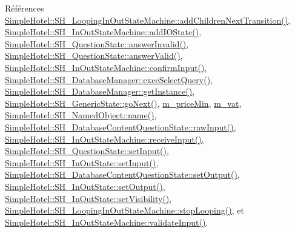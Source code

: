 Références \hyperlink{classSimpleHotel_1_1SH__LoopingInOutStateMachine_a2ac2ff43d97fd1b12e1b30d6818f33e4}{Simple\-Hotel\-::\-S\-H\-\_\-\-Looping\-In\-Out\-State\-Machine\-::add\-Children\-Next\-Transition()}, \hyperlink{classSimpleHotel_1_1SH__InOutStateMachine_a07ae9f1f74a9a41b26e77a014679a33e}{Simple\-Hotel\-::\-S\-H\-\_\-\-In\-Out\-State\-Machine\-::add\-I\-O\-State()}, \hyperlink{classSimpleHotel_1_1SH__QuestionState_a69caaa66c68de820a5afa9584f24ca31}{Simple\-Hotel\-::\-S\-H\-\_\-\-Question\-State\-::answer\-Invalid()}, \hyperlink{classSimpleHotel_1_1SH__QuestionState_ad69b23cffd57936805e7b66483c5c951}{Simple\-Hotel\-::\-S\-H\-\_\-\-Question\-State\-::answer\-Valid()}, \hyperlink{classSimpleHotel_1_1SH__InOutStateMachine_a949cdb448f813f201b6ca827d1c860e9}{Simple\-Hotel\-::\-S\-H\-\_\-\-In\-Out\-State\-Machine\-::confirm\-Input()}, \hyperlink{classSimpleHotel_1_1SH__DatabaseManager_ade052bd4f0e6aa490becef78ce4ea4d7}{Simple\-Hotel\-::\-S\-H\-\_\-\-Database\-Manager\-::exec\-Select\-Query()}, \hyperlink{classSimpleHotel_1_1SH__DatabaseManager_a0bcee98b94b5144e4c066000c4ae3321}{Simple\-Hotel\-::\-S\-H\-\_\-\-Database\-Manager\-::get\-Instance()}, \hyperlink{classSimpleHotel_1_1SH__GenericState_a5afea8cc17017b08b8db6d51b5bcefc4}{Simple\-Hotel\-::\-S\-H\-\_\-\-Generic\-State\-::go\-Next()}, \hyperlink{classSimpleHotel_1_1SH__ServiceCharging_a72f1c4a2c5ae6344b9e8a8dbd85f1029}{m\-\_\-price\-Min}, \hyperlink{classSimpleHotel_1_1SH__ServiceCharging_a4cb1fa10bbf8365734f68da006b887af}{m\-\_\-vat}, \hyperlink{classSimpleHotel_1_1SH__NamedObject_ad144716345034c91cface8f3163a799e}{Simple\-Hotel\-::\-S\-H\-\_\-\-Named\-Object\-::name()}, \hyperlink{classSimpleHotel_1_1SH__DatabaseContentQuestionState_af7b1002ee7209e3e8238a5e11fd0294b}{Simple\-Hotel\-::\-S\-H\-\_\-\-Database\-Content\-Question\-State\-::raw\-Input()}, \hyperlink{classSimpleHotel_1_1SH__InOutStateMachine_a17482446bbf0327e84feb5d6a1a612f0}{Simple\-Hotel\-::\-S\-H\-\_\-\-In\-Out\-State\-Machine\-::receive\-Input()}, \hyperlink{classSimpleHotel_1_1SH__QuestionState_ae404d8874e542fd5f3e6d658f003bae4}{Simple\-Hotel\-::\-S\-H\-\_\-\-Question\-State\-::set\-Input()}, \hyperlink{classSimpleHotel_1_1SH__InOutState_a30d45824ca3c749427ac8d40479cf072}{Simple\-Hotel\-::\-S\-H\-\_\-\-In\-Out\-State\-::set\-Input()}, \hyperlink{classSimpleHotel_1_1SH__DatabaseContentQuestionState_ab85498797a0318417580ad3f274b018a}{Simple\-Hotel\-::\-S\-H\-\_\-\-Database\-Content\-Question\-State\-::set\-Output()}, \hyperlink{classSimpleHotel_1_1SH__InOutState_a5e151d7b01cceb6766b6d83d4a9ac1aa}{Simple\-Hotel\-::\-S\-H\-\_\-\-In\-Out\-State\-::set\-Output()}, \hyperlink{classSimpleHotel_1_1SH__InOutState_a2da1edbe247e9b2661c81c9dc2c7ef8d}{Simple\-Hotel\-::\-S\-H\-\_\-\-In\-Out\-State\-::set\-Visibility()}, \hyperlink{classSimpleHotel_1_1SH__LoopingInOutStateMachine_a64951d436e3f998c7136415019021ec8}{Simple\-Hotel\-::\-S\-H\-\_\-\-Looping\-In\-Out\-State\-Machine\-::stop\-Looping()}, et \hyperlink{classSimpleHotel_1_1SH__InOutStateMachine_a3754990c3f90bb7d59e5028d3d6504d8}{Simple\-Hotel\-::\-S\-H\-\_\-\-In\-Out\-State\-Machine\-::validate\-Input()}.


